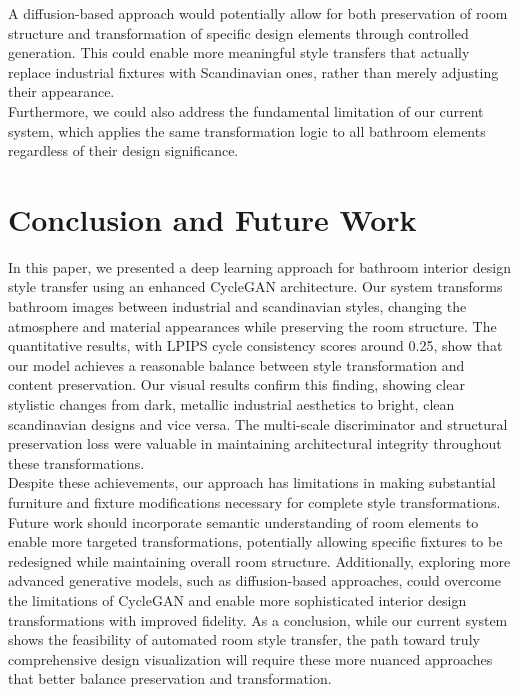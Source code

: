 \documentclass[twocolumn,superscriptaddress,aps]{revtex4-1}
\begin{document}
A diffusion-based approach would potentially allow for both preservation of room structure and transformation of specific design elements through controlled generation. This could enable more meaningful style transfers that actually replace industrial fixtures with Scandinavian ones, rather than merely adjusting their appearance. \\

Furthermore, we could also address the fundamental limitation of our current system, which applies the same transformation logic to all bathroom elements regardless of their design significance.

\section{Conclusion and Future Work}

In this paper, we presented a deep learning approach for bathroom interior design style transfer using an enhanced CycleGAN architecture. Our system transforms bathroom images between industrial and scandinavian styles, changing the atmosphere and material appearances while preserving the room structure. The quantitative results, with LPIPS cycle consistency scores around 0.25, show that our model achieves a reasonable balance between style transformation and content preservation. Our visual results confirm this finding, showing clear stylistic changes from dark, metallic industrial aesthetics to bright, clean scandinavian designs and vice versa. The multi-scale discriminator and structural preservation loss were valuable in maintaining architectural integrity throughout these transformations. \\

Despite these achievements, our approach has limitations in making substantial furniture and fixture modifications necessary for complete style transformations. Future work should incorporate semantic understanding of room elements to enable more targeted transformations, potentially allowing specific fixtures to be redesigned while maintaining overall room structure. Additionally, exploring more advanced generative models, such as diffusion-based approaches, could overcome the limitations of CycleGAN and enable more sophisticated interior design transformations with improved fidelity. As a conclusion, while our current system shows the feasibility of automated room style transfer, the path toward truly comprehensive design visualization will require these more nuanced approaches that better balance preservation and transformation.
\end{document}
